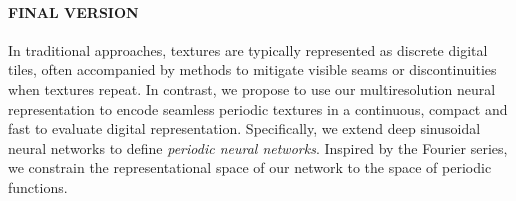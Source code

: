 \paragraph{FINAL VERSION}
In traditional approaches, textures are typically represented as discrete digital tiles, often accompanied by methods to mitigate visible seams or discontinuities when textures repeat. In contrast, we propose to use our multiresolution neural representation to encode seamless periodic textures in a continuous, compact and fast to evaluate digital representation. Specifically, we extend deep sinusoidal neural networks to define \textit{periodic neural networks}. Inspired by the Fourier series, we constrain the representational space of our network to the space of periodic functions.